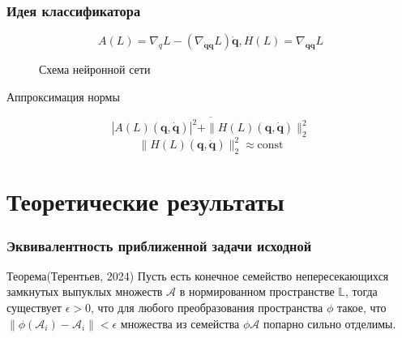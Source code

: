 \documentclass{beamer}
\begin{document}
\begin{frame}
\frametitle{Идея классификатора}
$$A(L) = \nabla_{q} L-\left(\nabla_{\dot{\mathbf{q}}\mathbf{q}} L\right) \dot{\mathbf{q}}, H(L) = \nabla_{\dot{\mathbf{q}} \dot{\mathbf{q}}} L$$

\begin{figure}
\centering
{}
\caption{Схема нейронной сети}
\label{fig: LNN}
\end{figure}
\begin{block}{Аппроксимация нормы}

$$\overline{|A(L)\left(\mathbf{q}, \dot{\mathbf{q}}\right)|^2 + \|H(L)\left(\mathbf{q}, \dot{\mathbf{q}}\right)\|_2^2}$$
$$\|H(L)\left(\mathbf{q}, \dot{\mathbf{q}}\right)\|_2^2 \approx \text{const}$$
\end{block}

\end{frame}

\section{Теоретические результаты}

\begin{frame}
\frametitle{Эквивалентность приближенной задачи исходной}

\begin{block} {Теорема(Терентьев, 2024)}
Пусть есть конечное семейство непересекающихся замкнутых выпуклых множеств $\mathcal{A}$ в нормированном пространстве $\mathbb{L}$, тогда существует $\epsilon > 0$, что для любого преобразования пространства $\phi$ такое, что $\|\phi(\mathcal{A}_{i}) - \mathcal{A}_{i}\| < \epsilon$ множества из семейства $\phi{\mathcal{A}}$ попарно сильно отделимы.
\end{block} 
\end{frame}
\end{document}
